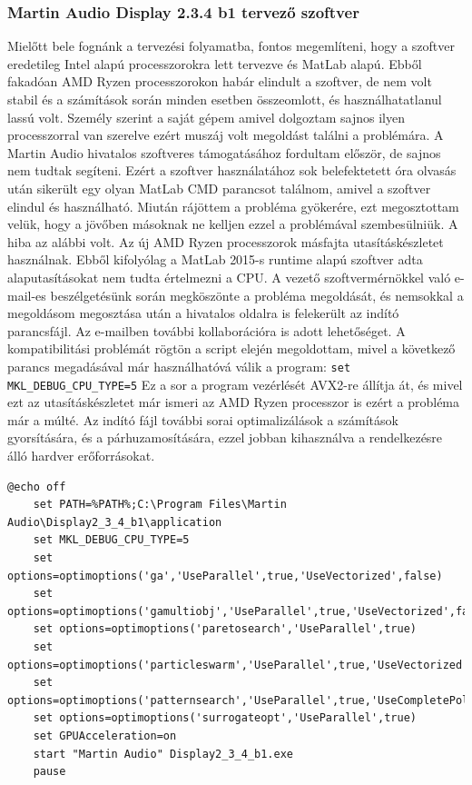 \subsubsection{Martin Audio Display 2.3.4 b1 tervező szoftver~\cite{DISPLAY23USERGUIDE}}
Mielőtt bele fognánk a tervezési folyamatba, fontos megemlíteni, hogy a szoftver
eredetileg Intel alapú processzorokra lett tervezve és MatLab alapú. Ebből fakadóan
AMD Ryzen processzorokon habár elindult a szoftver, de nem volt stabil és a számítások során
minden esetben összeomlott, és használhatatlanul lassú volt. Személy szerint a saját gépem amivel dolgoztam
sajnos ilyen processzorral van szerelve ezért muszáj volt megoldást találni a problémára.
A Martin Audio hivatalos szoftveres támogatásához fordultam először, de sajnos nem tudtak segíteni.
Ezért a szoftver használatához
sok belefektetett óra olvasás után sikerült egy olyan MatLab CMD parancsot találnom, amivel
a szoftver elindul és használható.
Miután rájöttem a probléma gyökerére, ezt megosztottam velük, hogy a jövőben másoknak ne kelljen
ezzel a problémával szembesülniük.
A hiba az alábbi volt. Az új AMD Ryzen processzorok másfajta utasításkészletet használnak.
Ebből kifolyólag a MatLab 2015-s runtime alapú szoftver adta alaputasításokat nem tudta értelmezni a CPU.
A vezető szoftvermérnökkel való e-mail-es beszélgetésünk során megköszönte a probléma
megoldását, és nemsokkal a megoldásom megosztása után a hivatalos oldalra is felekerült
az indító parancsfájl. Az e-mailben további kollaborációra is adott lehetőséget.
A kompatibilitási problémát rögtön a script elején megoldottam,
mivel a következő parancs megadásával már használhatóvá válik a program: \texttt{set MKL\_DEBUG\_CPU\_TYPE=5} \newline
Ez a sor a program vezérlését AVX2-re állítja át, és mivel ezt az utasításkészletet már ismeri az AMD Ryzen processzor
is ezért a probléma már a múlté.
Az indító fájl további sorai optimalizálások a számítások gyorsítására, és a párhuzamosítására, ezzel jobban kihasználva
a rendelkezésre álló hardver erőforrásokat.\newpage
\begin{lstlisting}[caption={A Display 2.3.4 b1 indító ".bat" scriptje AMD Ryzen processzorokhoz}, label=batcode, xleftmargin=\parindent]
    @echo off
    set PATH=%PATH%;C:\Program Files\Martin Audio\Display2_3_4_b1\application
    set MKL_DEBUG_CPU_TYPE=5
    set options=optimoptions('ga','UseParallel',true,'UseVectorized',false)
    set options=optimoptions('gamultiobj','UseParallel',true,'UseVectorized',false)
    set options=optimoptions('paretosearch','UseParallel',true)
    set options=optimoptions('particleswarm','UseParallel',true,'UseVectorized',false)
    set options=optimoptions('patternsearch','UseParallel',true,'UseCompletePoll',true,'UseVectorized',false)
    set options=optimoptions('surrogateopt','UseParallel',true)
    set GPUAcceleration=on
    start "Martin Audio" Display2_3_4_b1.exe
    pause
\end{lstlisting}
